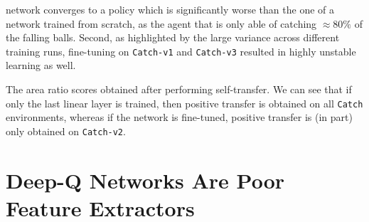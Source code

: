 network converges to a policy which is significantly worse than the one of a network trained from scratch, as the agent that is only able of catching $\approx 80\%$ of the falling balls. Second, as highlighted by the large variance across different training runs, fine-tuning on \texttt{Catch-v1} and \texttt{Catch-v3} resulted in highly unstable learning as well.    



\begin{table}
	\centering
	\caption{The area ratio scores obtained after performing self-transfer. We can see that if only the last linear layer is trained, then positive transfer is obtained on all \texttt{Catch} environments, whereas if the network is fine-tuned, positive transfer is (in part) only obtained on \texttt{Catch-v2}.}
	
	\label{tab:self_tl_area_ratio}
\end{table}

\section{Deep-Q Networks Are Poor Feature Extractors}
\label{sec:hybrid_self_transfer}




